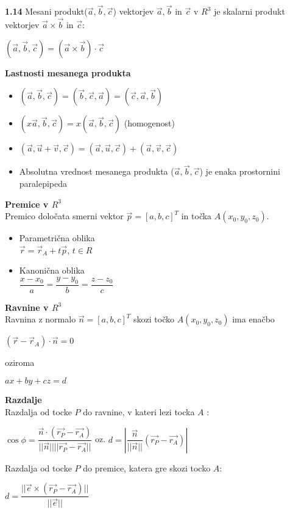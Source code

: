 \documentclass{article}
\begin{document}
\begin{multicols}{4}
	\textbf{1.14} Mesani produkt($\vec{a}, \vec{b}, \vec{c}$) vektorjev
	$\vec{a}, \vec{b}$ in $\vec{c}$ v $R^{3}$ je skalarni produkt vektorjev
	$\vec{a} \times \vec{b}$ in $\vec{c}$:
	\begin{center}
		$(\vec{a}, \vec{b}, \vec{c}) = (\vec{a} \times \vec{b})\cdot \vec{c}$
	\end{center}

	\textbf{Lastnosti mesanega produkta}
	\begin{itemize}
		\item $(\vec{a}, \vec{b}, \vec{c}) = (\vec{b}, \vec{c}, \vec{a}) = (\vec{c}, \vec{a}, \vec{b})$
		\item $(x\vec{a}, \vec{b}, \vec{c}) = x(\vec{a}, \vec{b}, \vec{c})$ (homogenost)
		\item $(\vec{a}, \vec{u} + \vec{v}, \vec{c}) = (\vec{a}, \vec{u}, \vec{c}) + (\vec{a}, \vec{v}, \vec{c})$
		\item Absolutna vrednost mesanega produkta ($\vec{a}, \vec{b}, \vec{c}$) je enaka prostornini paralepipeda
	\end{itemize}

	\textbf{Premice v $R^{3}$} \\
	Premico določata smerni vektor $\vec{p} = [a, b, c]^{T}$ in točka $A(x_0, y_0, z_0)$.
	\begin{itemize}
		\item Parametrična oblika\\
		      $\vec{r} = \vec{r}_{A} + t\vec{p}$, $t \in R$
		      \vfill\null
		      \columnbreak
		\item Kanonična oblika\\
		      $\dfrac{x - x_{0}}{a} = \dfrac{y - y_{0}}{b} = \dfrac{z - z_{0}}{c}$
	\end{itemize}

	\textbf{Ravnine v $R^{3}$} \\
	Ravnina z normalo $\vec{n} = [a, b, c]^T$ skozi točko $A(x_0, y_0, z_0)$ ima enačbo
	\begin{center}
		$(\vec{r} - \vec{r}_A) \cdot \vec{n} = 0$
	\end{center}
	oziroma
	\begin{center}
		$ax + by + cz = d$
	\end{center}

	\textbf{Razdalje}\\
	Razdalja od tocke $P$ do ravnine, v kateri lezi tocka $A$ :
	\begin{center}
		$\cos\phi = \dfrac{\vec{n} \cdot ( \vec{r_{P}} - \vec{r_{A}})} {||\vec{n}|| ||\vec{r_{P}} - \vec{r_{A}}||}$ oz.
		$d = |\dfrac{\vec{n}}{||\vec{n}||} ( \vec{r_{P}} - \vec{r_{A}})|$
	\end{center}
	Razdalja od tocke $P$ do premice, katera gre skozi tocko $A$:
	\begin{center}
		$d = \dfrac{||\vec{e} \times ( \vec{r_{P}} - \vec{r_{A}})||}{||\vec{e}||}$
	\end{center}


\end{multicols}
\end{document}
